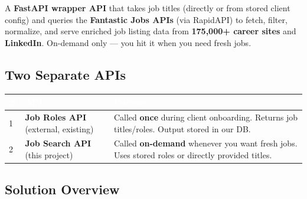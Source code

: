 \documentclass[11pt, a4paper]{article}
\begin{document}
\begin{accentbox}
A \textbf{FastAPI wrapper API} that takes job titles (directly or from stored client config) and queries the \textbf{Fantastic Jobs APIs} (via RapidAPI) to fetch, filter, normalize, and serve enriched job listing data from \textbf{175,000+ career sites} and \textbf{LinkedIn}. On-demand only --- you hit it when you need fresh jobs.
\end{accentbox}

\subsection{Two Separate APIs}

\begin{center}
\small
\begin{tabularx}{\textwidth}{|C{1.5cm}|L{3.5cm}|X|}
\hline
{}
\textcolor{white}{\textbf{\#}} & \textcolor{white}{\textbf{API}} & \textcolor{white}{\textbf{Purpose}} \\
 & \textbf{Job Roles API} (external, existing) & Called \textbf{once} during client onboarding. Returns job titles/roles. Output stored in our DB. \\
2 & \textbf{Job Search API} (this project) & Called \textbf{on-demand} whenever you want fresh jobs. Uses stored roles or directly provided titles. \\
\hline
\end{tabularx}
\end{center}

\subsection{Solution Overview}
\end{document}
